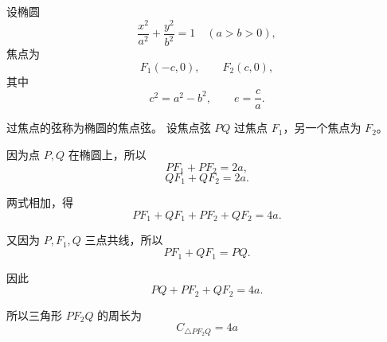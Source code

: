 
设椭圆
\[
	\frac{x^2}{a^2}+\frac{y^2}{b^2}=1
	\quad (a>b>0),
\]
焦点为
\[
	F_1(-c,0),\qquad F_2(c,0),
\]
其中
\[
	c^2=a^2-b^2,\qquad e=\frac ca.
\]

过焦点的弦称为椭圆的焦点弦。
设焦点弦 \(PQ\) 过焦点 \(F_1\)，另一个焦点为 \(F_2\)。

因为点 \(P,Q\) 在椭圆上，所以
\[
	PF_1+PF_2=2a,
\]
\[
	QF_1+QF_2=2a.
\]

两式相加，得
\[
	PF_1+QF_1+PF_2+QF_2=4a.
\]

又因为 \(P,F_1,Q\) 三点共线，所以
\[
	PF_1+QF_1=PQ.
\]

因此
\[
	PQ+PF_2+QF_2=4a.
\]

所以三角形 \(PF_2Q\) 的周长为
\[
	\boxed{
		C_{\triangle PF_2Q}=4a
	}
\]